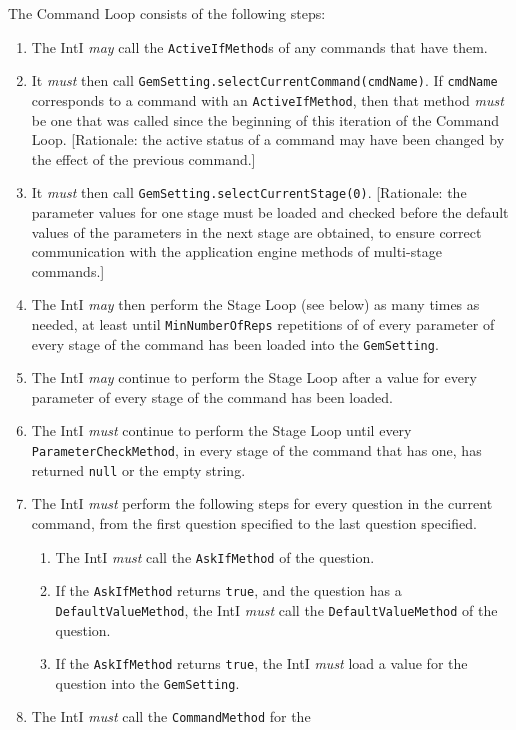 \documentclass[11pt]{article}
\newcommand{\must}{{\it must}}
\newcommand{\may}{{\it may}}
\newcounter{coreReq}
\begin{document}
\noindent
The Command Loop consists of the following steps:
\begin{enumerate}
\setcounter{enumi}{\value{coreReq}}
\item The IntI {\may} call the {\tt ActiveIfMethod}s of any commands
  that have them.
\item It {\must} then call
  {\tt GemSetting.selectCurrentCommand(cmdName)}.  If {\tt cmdName}
  corresponds to a command with an {\tt ActiveIfMethod}, then that method
  {\must} be one that was called since the beginning of this iteration of
  the Command Loop.  [Rationale:  the active status of a command may have
  been changed by the effect of the previous command.]
\item It {\must} then call {\tt GemSetting.selectCurrentStage(0)}.
  [Rationale: the parameter values for one stage must be loaded and checked
  before the default values of the parameters in the next stage are
  obtained, to ensure correct communication with the application
  engine methods of multi-stage commands.]
\item The IntI {\may} then perform the Stage Loop (see below)
  as many
  times as needed, at least until {\tt MinNumberOfReps} repetitions of of
  every parameter of every stage of the command has been loaded into the
  {\tt GemSetting}.
\item The IntI {\it may} continue to perform the Stage Loop
  after a value for every parameter of every stage of the command has been
  loaded.
\item The IntI {\must} continue to perform the Stage Loop until
  every {\tt ParameterCheckMethod}, in every stage of the command that
  has one, has returned {\tt null} or the empty string.
\item The IntI {\it must} perform the following steps
  for every question in the current command,
  from the first question specified to the last question specified.
  \begin{enumerate}
  \item The IntI {\must} call the {\tt AskIfMethod} of the question.
  \item If the {\tt AskIfMethod} returns {\tt true}, and the question
    has a {\tt DefaultValueMethod}, the IntI {\must}
    call the {\tt DefaultValueMethod} of the question.
  \item If the {\tt AskIfMethod} returns {\tt true}, the IntI {\must}
    load a value for the question into the {\tt GemSetting}.
  \end{enumerate}
\item The IntI {\must} call the {\tt CommandMethod} for the

\end{enumerate}
\end{document}
